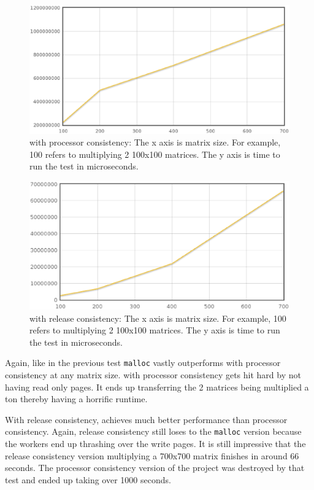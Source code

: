 \begin{figure}[!h]
\centering
\includegraphics[scale=0.40]{images/mmult-lh-fixed-thread.eps}
\caption{\projname{} with processor consistency: The x axis is matrix size. For example, 100 refers to multiplying 2 100x100 matrices. The y axis is time to run the test in microseconds.}
\end{figure}

\begin{figure}[!h]
\centering
\includegraphics[scale=0.40]{images/mmlh-fixed-threads.eps}
\caption{\projname{} with release consistency: The x axis is matrix size. For example, 100 refers to multiplying 2 100x100 matrices. The y axis is time to run the test in microseconds.}
\end{figure}

Again, like in the previous test \verb,malloc, vastly outperforms \projname{} with processor consistency at any matrix size. \projname{} with processor consistency gets hit hard by not having read only pages. It ends up transferring the 2 matrices being multiplied a ton thereby having a horrific runtime.

With release consistency, \projname{} achieves much better performance than processor consistency. Again, release consistency still loses to the \verb,malloc, version because the workers end up thrashing over the write pages. It is still impressive that the release consistency version multiplying a 700x700 matrix finishes in around 66 seconds. The processor consistency version of the project was destroyed by that test and ended up taking over 1000 seconds.
